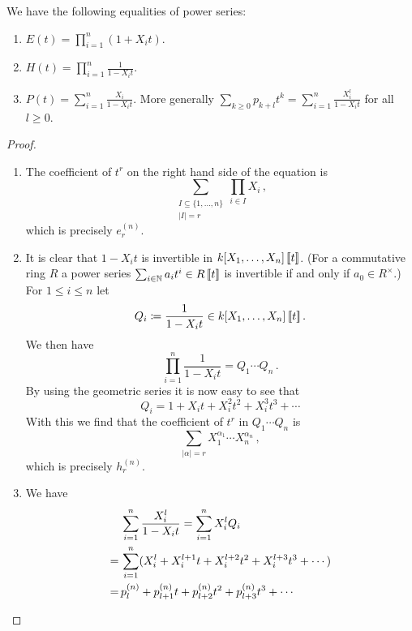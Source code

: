 \begin{prop}
  We have the following equalities of power series:
  \begin{enumerate}[label=\emph{\alph*)},leftmargin=*]
    \item
      $E(t) = \prod_{i=1}^n (1 + X_i t)$.
    \item
      $H(t) = \prod_{i=1}^n \frac{1}{1 - X_i t}$.
    \item
      $P(t) = \sum_{i=1}^n \frac{X_i}{1 - X_i t}$.
      More generally $\sum_{k \geq 0} p_{k+l} t^k = \sum_{i=1}^n \frac{X_i^l}{1 - X_i t}$ for all $l \geq 0$.
  \end{enumerate}
\end{prop}
\begin{proof}
  \begin{enumerate}[label=\emph{\alph*)},leftmargin=*]
    \item
      The coefficient of $t^r$ on the right hand side of the equation is
      \[
        \sum_{\substack{I \subseteq \{1, \dotsc, n\} \\ |I| = r}} \prod_{i \in I} X_i \,,
      \]
      which is precisely $e^{(n)}_r$.
    \item
      It is clear that $1-X_i t$ is invertible in $k[X_1, \dotsc, X_n]\left[\!\left[t\right]\!\right]$.
      (For a commutative ring $R$ a power series $\sum_{i \in \mathbb{N}} a_i t^i \in R\left[\!\left[t\right]\!\right]$ is invertible if and only if $a_0 \in R^\times$.)
      For $1 \leq i \leq n$ let
      \[
                  Q_i
        \coloneqq \frac{1}{1-X_i t} \in k[X_1, \dotsc, X_n] \left[\!\left[t\right]\!\right] .
      \]
      We then have
      \[
          \prod_{i=1}^n \frac{1}{1-X_i t}
        = Q_1 \dotsm Q_n \,.
      \]
      By using the geometric series it is now easy to see that
      \[
          Q_i
        = 1 + X_i t + X_i^2 t^2 + X_i^3 t^3 + \dotsb
      \]
      With this we find that the coefficient of $t^r$ in $Q_1 \dotsm Q_n$ is
      \[
        \sum_{|\alpha| = r} X_1^{\alpha_1} \dotsm X_n^{\alpha_n} \,,
      \]
      which is precisely $h^{(n)}_r$.
    \item
      We have
      \begin{align*}
         &\, \sum_{i=1}^n \frac{X_i^l}{1-X_i t}
        =    \sum_{i=1}^n X_i^l Q_i \\
        =&\, \sum_{i=1}^n (X_i^l + X_i^{l+1} t + X_i^{l+2} t^2 + X_i^{l+3} t^3 + \dotsb) \\
        =&\, p^{(n)}_l + p^{(n)}_{l+1} t + p^{(n)}_{l+2} t^2 + p^{(n)}_{l+3} t^3 + \dotsb
        \qedhere
      \end{align*}
  \end{enumerate}
\end{proof}


